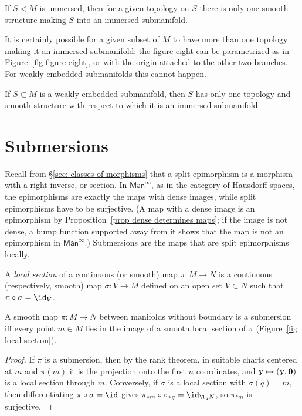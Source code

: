 \begin{thm}\label{thm 5.32 Lee}
    If $S<M$ is immersed, then for a given topology on $S$ there is only one smooth structure making $S$ into an immersed submanifold.
\end{thm}

It is certainly possible for a given subset of $M$ to have more than one topology making it an immersed submanifold: the figure eight can be parametrized as in Figure~\ref{fig figure eight}, or with the origin attached to the other two branches. For weakly embedded submanifolds this cannot happen.

\begin{thm}\label{thm 5.33 Lee}
    If $S\subset M$ is a weakly embedded submanifold, then $S$ has only one topology and smooth structure with respect to which it is an immersed submanifold.
\end{thm}


\section{Submersions}\label{sec: submersions}

Recall from \S\ref{sec: classes of morphisms} that a split epimorphism is a morphism with a right inverse, or section. In $\mathsf{Man}^\infty$, as in the category of Hausdorff spaces, the epimorphisms are exactly the maps with dense images, while split epimorphisms have to be surjective. (A map with a dense image is an epimorphism by Proposition~\ref{prop dense determines maps}; if the image is not dense, a bump function supported away from it shows that the map is not an epimorphism in $\mathsf{Man}^\infty$.) Submersions are the maps that are split epimorphisms locally.

\begin{defn}
    A \emph{local section} of a continuous (or smooth) map $\pi:M\to N$ is a continuous (respectively, smooth) map $\sigma:V\to M$ defined on an open set $V\subset N$ such that $\pi\circ\sigma=\id_V$.
\end{defn}

\begin{thm}\label{thm: local section}
    A smooth map $\pi:M\to N$ between manifolds without boundary is a submersion iff every point $m\in M$ lies in the image of a smooth local section of $\pi$ (Figure~\ref{fig local section}).
\end{thm}
\begin{proof}
    If $\pi$ is a submersion, then by the rank theorem, in suitable charts centered at $m$ and $\pi(m)$ it is the projection onto the first $n$ coordinates, and $\bf{y}\mapsto(\bf{y},0)$ is a local section through $m$. Conversely, if $\sigma$ is a local section with $\sigma(q)=m$, then differentiating $\pi\circ\sigma=\id$ gives $\pi_{\ast m}\circ\sigma_{\ast q}=\id_{\T_qN}$, so $\pi_{\ast m}$ is surjective.
\end{proof}

